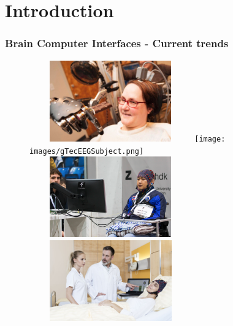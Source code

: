 \documentclass[aspectratio=169]{beamer}
\begin{document}
\section{Introduction}
\begin{frame}
\frametitle{Brain Computer Interfaces - Current trends}
\begin{center}
\begin{figure}[]
\centering
\includegraphics[height=3.5cm,width=7cm]{images/Jane.jpg}
\texttt{[image: images/gTecEEGSubject.png]}\\
\includegraphics[height=3.5cm,width=7cm]{images/Cybathlon.png}
\includegraphics[height=3.5cm,width=7cm]{images/DoC.jpg}
\label{fig:digitalelectroencephalograph}
\end{figure}
\end{center}
\end{frame}
\end{document}
